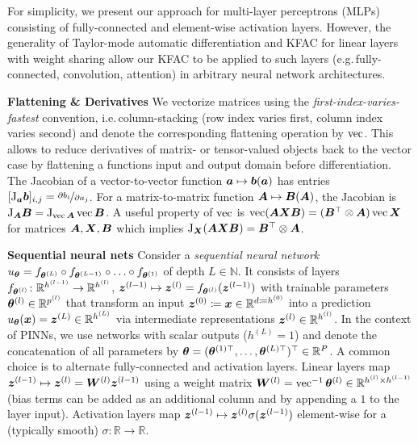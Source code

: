 For simplicity, we present our approach for multi-layer perceptrons (MLPs) consisting of fully-connected and element-wise activation layers.
However, the generality of Taylor-mode automatic differentiation and KFAC for linear layers with weight sharing allow our KFAC to be applied to such layers (e.g.\,fully-connected, convolution, attention) in arbitrary neural network architectures.

\textbf{Flattening \& Derivatives}
We vectorize matrices using the \emph{first-index-varies-fastest} convention, i.e.\,column-stacking (row index varies first, column index varies second) and denote the corresponding flattening operation by $\operatorname{vec}$.
This allows to reduce derivatives of matrix- or tensor-valued objects back to the vector case by flattening a functions input and output domain before differentiation.
The Jacobian of a vector-to-vector function ${\bm{a}} \mapsto {\bm{b}}({\bm{a}})$ has entries $[\mathrm{J}_{{\bm{a}}}{\bm{b}}]_{i,j} = \nicefrac{\partial {b}_i}{\partial {a}_j}$.
For a matrix-to-matrix function ${\bm{A}} \mapsto {\bm{B}}({\bm{A}})$, the Jacobian is $\mathrm{J}_{{\bm{A}}} {\bm{B}} = \mathrm{J}_{\operatorname{vec} {\bm{A}} }\operatorname{vec}{\bm{B}}$.
A useful property of $\operatorname{vec}$ is $\operatorname{vec}({\bm{A}}{\bm{X}}{\bm{B}}) = ({\bm{B}}^\top\otimes {\bm{A}})\operatorname{vec}{{\bm{X}}}$ for matrices ${\bm{A}}, {\bm{X}}, {\bm{B}}$ which implies $\mathrm{J}_{\bm{X}}({\bm{A}}{\bm{X}}{\bm{B}}) = {\bm{B}}^\top\otimes {\bm{A}}$.

\textbf{Sequential neural nets} Consider a \emph{sequential neural network} $u_{{\bm{\theta}}} = f_{{\bm{\theta}}^{(L)}} \circ f_{{\bm{\theta}}^{(L-1)}} \circ \ldots \circ f_{{\bm{\theta}}^{(1)}} $ of depth $L\in\mathbb N$. It consists of layers $f_{{\bm{\theta}}^{(l)}}\colon {\mathbb{R}}^{h^{(l-1)}}\to{\mathbb{R}}^{h^{(l)}}$, ${\bm{z}}^{(l-1)}\mapsto {\bm{z}}^{(l)} = f_{{\bm{\theta}}^{(l)}}({\bm{z}}^{(l-1)})$ with trainable parameters ${\bm{\theta}}^{(l)} \in {\mathbb{R}}^{p^{(l)}}$ that transform an input ${\bm{z}}^{(0)} \coloneqq {\bm{x}} \in \mathbb R^{d \coloneqq h^{(0)}}$ into a prediction $u_{\bm{\theta}}({\bm{x}}) = {\bm{z}}^{(L)} \in {\mathbb{R}}^{h^{(L)}}$ via intermediate representations ${\bm{z}}^{(l)} \in {\mathbb{R}}^{h^{(l)}}$.
In the context of PINNs, we use networks with scalar outputs ($h^{(L)}=1$) and denote the concatenation of all parameters by ${\bm{\theta}} = ({\bm{\theta}}^{(1)\top}, \dots, {\bm{\theta}}^{(L)\top})^{\top} \in {\mathbb{R}}^P$.
A common choice is to alternate fully-connected and activation layers.
Linear layers map ${\bm{z}}^{(l-1)} \mapsto {\bm{z}}^{(l)} = {\bm{W}}^{(l)} {\bm{z}}^{(l-1)}$ using a weight matrix ${\bm{W}}^{(l)} = \operatorname{vec}^{-1}{\bm{\theta}}^{(l)}  \in {\mathbb{R}}^{h^{(l)} \times h^{(l-1)}}$ (bias terms can be added as an additional column and by appending a $1$ to the layer input).
Activation layers map ${\bm{z}}^{(l-1)}\mapsto {\bm{z}}^{(l)} \sigma({\bm{z}}^{(l-1)})$ element-wise for a (typically smooth) $\sigma\colon\mathbb R\to\mathbb R$.

